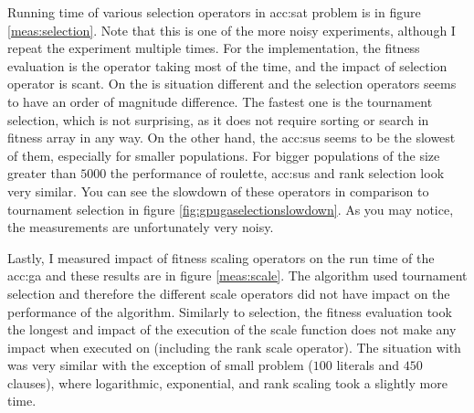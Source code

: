 Running time of various selection operators in \acrshort{acc:sat} problem is in figure \ref{meas:selection}. Note that this is one of the more noisy experiments, although I repeat the experiment multiple times. For the \cpu implementation, the fitness evaluation is the operator taking most of the time, and the impact of selection operator is scant. On the \gpu is situation different and the selection operators seems to have an order of magnitude difference. The fastest one is the tournament selection, which is not surprising, as it does not require sorting or search in fitness array in any way. On the other hand, the \acrshort{acc:sus} seems to be the slowest of them, especially for smaller populations. For bigger populations of the size greater than $5000$ the performance of roulette, \acrshort{acc:sus} and rank selection look very similar. You can see the slowdown of these operators in comparison to tournament selection in figure \ref{fig:gpugaselectionslowdown}. As you may notice, the measurements are unfortunately very noisy.

Lastly, I measured impact of fitness scaling operators on the run time of the \acrshort{acc:ga} and these results are in figure \ref{meas:scale}. The algorithm used tournament selection and therefore the different scale operators did not have impact on the performance of the algorithm. Similarly to selection, the fitness evaluation took the longest and impact of the execution of the scale function does not make any impact when executed on \cpu (including the rank scale operator). The situation with \gpu was very similar with the exception of small problem ($100$ literals and $450$ clauses), where logarithmic, exponential, and rank scaling took a slightly more time.
